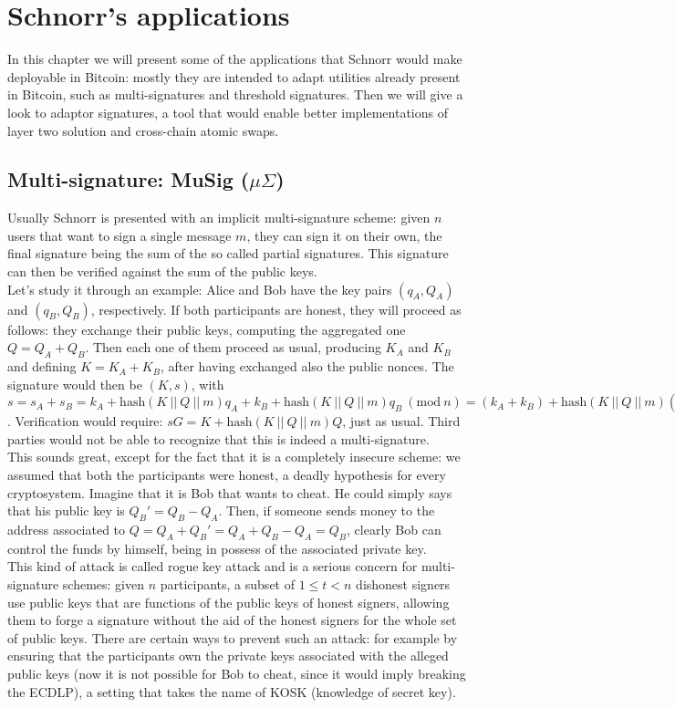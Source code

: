 \chapter{Schnorr's applications}
\label{chpr:application}
In this chapter we will present some of the applications that Schnorr would make deployable in Bitcoin: mostly they are intended to adapt utilities already present in Bitcoin, such as multi-signatures and threshold signatures. Then we will give a look to adaptor signatures, a tool that would enable better implementations of layer two solution and cross-chain atomic swaps.

\bigskip

\section{Multi-signature: MuSig ($\mu \Sigma$)}
Usually Schnorr is presented with an implicit multi-signature scheme: given $n$ users that want to sign a single message $m$, they can sign it on their own, the final signature being the sum of the so called partial signatures. This signature can then be verified against the sum of the public keys.
\\
Let's study it through an example: Alice and Bob have the key pairs $(q_A, Q_A)$ and $(q_B, Q_B)$, respectively. If both participants are honest, they will proceed as follows: they exchange their public keys, computing the aggregated one $Q = Q_A + Q_B$. Then each one of them proceed as usual, producing $K_A$ and $K_B$ and defining $K = K_A + K_B$, after having exchanged also the public nonces. The signature would then be $(K, s)$, with $s = s_A + s_B = k_A + \text{hash}(K \ || \ Q \ || \ m)q_A + k_B + \text{hash}(K \ || \ Q \ || \ m)q_B \ (\text{mod} \ n)= (k_A + k_B) + \text{hash}(K \ || \ Q \ || \ m)(q_A + q_B) \ (\text{mod} \ n)$. Verification would require: $sG = K + \text{hash}(K \ || \ Q \ || \ m)Q$, just as usual. Third parties would not be able to recognize that this is indeed a multi-signature.
\\
This sounds great, except for the fact that it is a completely insecure scheme: we assumed that both the participants were honest, a deadly hypothesis for every cryptosystem. Imagine that it is Bob that wants to cheat. He could simply says that his public key is $Q_B' = Q_B - Q_A$. Then, if someone sends money to the address associated to $Q = Q_A + Q_B' = Q_A + Q_B - Q_A = Q_B$, clearly Bob can control the funds by himself, being in possess of the associated private key.
\\
This kind of attack is called rogue key attack and is a serious concern for multi-signature schemes: given $n$ participants, a subset of $1 \leq t < n$ dishonest signers use public keys that are functions of the public keys of honest signers, allowing them to forge a signature without the aid of the honest signers for the whole set of public keys. There are certain ways to prevent such an attack: for example by ensuring that the participants own the private keys associated with the alleged public keys (now it is not possible for Bob to cheat, since it would imply breaking the ECDLP), a setting that takes the name of KOSK (knowledge of secret key). 

